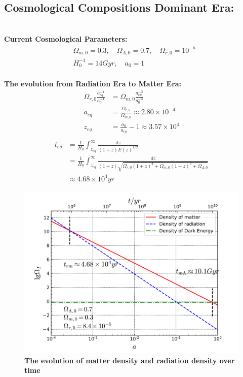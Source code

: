 \documentclass[14pt]{article}
\begin{document}
\subsection{Cosmological Compositions Dominant Era:}

\quad\\
\textbf{Current Cosmological Parameters:}
\begin{align*}
    &\Omega_{m,0}=0.3,\quad \Omega_{\Lambda,0}=0.7,\quad \Omega_{r,0}=10^{-5}\\
    &H^{-1}_{0}=14Gyr,\quad a_{0}=1\tag{1.5.1}
\end{align*}
\quad\\
\textbf{The evolution from Radiation Era to Matter Era:}
\begin{align*}
\Omega_{r,0}\displaystyle\frac{a^{-4}_{eq}}{a^{-4}_{0}}&=\Omega_{m,0}\displaystyle\frac{a^{-3}_{eq}}{a^{-3}_{0}}\tag{1.5.2}\\
a_{eq}&=\frac{\Omega_{r,0}}{\Omega_{m,0}} \approx 2.80\times 10^{-4} \tag{1.5.3}\\
z_{eq}&=\frac{a_{0}}{a_{eq}}-1 \approx 3.57 \times 10^{4}\tag{1.5.4}\\
\end{align*}
\begin{align*}
  t_{eq}&=\frac{1}{H_{0}}\int^{\infty}_{z_{eq}}\displaystyle\frac{dz}{(1+z)E(z)^{1/2}}\\
      &=\frac{1}{H_{0}}\int^{\infty}_{z_{eq}}\displaystyle\frac{dz}{(1+z)\sqrt{\Omega_{r,0}(1+z)^{4}+\Omega_{m,0}(1+z)^{3}+\Omega_{\Lambda,0}}}\\
      &\approx 4.68\times 10^{4}yr  \tag{1.5.5}
\end{align*}
\begin{figure}[H]
\centering
\includegraphics[scale=1]{Era_rmL.png}
\caption{\textbf{The evolution of matter density and radiation density over time}}
\end{figure}
\end{document}
